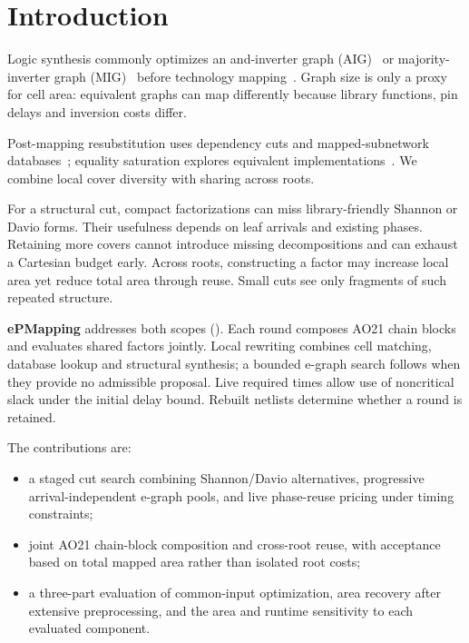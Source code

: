 \section{Introduction}
Logic synthesis commonly optimizes an and-inverter graph (AIG)~\cite{AIG} or majority-inverter graph (MIG)~\cite{MIG,MIG_TCAD} before technology mapping~\cite{calvino2022mapping}. Graph size is only a proxy for cell area: equivalent graphs can map differently because library functions, pin delays and inversion costs differ.

Post-mapping resubstitution uses dependency cuts and mapped-subnetwork databases~\cite{iwls24,aspdac25}; equality saturation explores equivalent implementations~\cite{ustun2022impress,cheng2024seer,coward2024rover,chen2024esyn}. We combine local cover diversity with sharing across roots.

For a structural cut, compact factorizations can miss library-friendly Shannon or Davio forms. Their usefulness depends on leaf arrivals and existing phases. Retaining more covers cannot introduce missing decompositions and can exhaust a Cartesian budget early. Across roots, constructing a factor may increase local area yet reduce total area through reuse. Small cuts see only fragments of such repeated structure.

\textbf{ePMapping} addresses both scopes (). Each round composes AO21 chain blocks and evaluates shared factors jointly. Local rewriting combines cell matching, database lookup and structural synthesis; a bounded e-graph search follows when they provide no admissible proposal. Live required times allow use of noncritical slack under the initial delay bound. Rebuilt netlists determine whether a round is retained.

The contributions are:
\begin{itemize}
 \item a staged cut search combining Shannon/Davio alternatives, progressive arrival-independent e-graph pools, and live phase-reuse pricing under timing constraints;
 \item joint AO21 chain-block composition and cross-root reuse, with acceptance based on total mapped area rather than isolated root costs;
 \item a three-part evaluation of common-input optimization, area recovery after extensive preprocessing, and the area and runtime sensitivity to each evaluated component.
\end{itemize}
